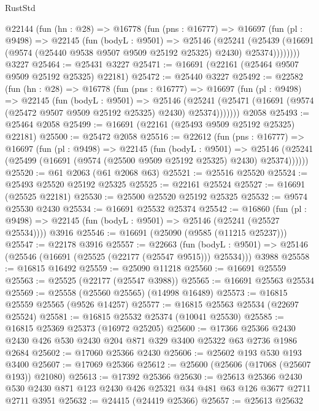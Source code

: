 \begin{lexlean}{RustStd}
\begin{coremodule}
    @22144
      (fun (hn : @28) =>
      @16778
        (fun (pns : @16777) =>
        @16697
          (fun (pl : @9498) =>
          @22145
            (fun (bodyL : @9501) =>
            @25146
              (@25241
                (@25439
                  (@16691 (@9574 (@25440 @9538 @9507 @9509 @25192 @25325) @2430) @25374))))))))
    @3227
@25464 := @25431 @3227
@25471 := @16691 (@22161 (@25464 @9507 @9509 @25192 @25325) @22181)
@25472 := @25440 @3227
@25492 := @22582
    (fun (hn : @28) =>
    @16778
      (fun (pns : @16777) =>
      @16697
        (fun (pl : @9498) =>
        @22145
          (fun (bodyL : @9501) =>
          @25146
            (@25241 (@25471 (@16691 (@9574 (@25472 @9507 @9509 @25192 @25325) @2430) @25374)))))))
    @2058
@25493 := @25464 @2058
@25499 := @16691 (@22161 (@25493 @9509 @25192 @25325) @22181)
@25500 := @25472 @2058
@25516 := @22612
    (fun (pns : @16777) =>
    @16697
      (fun (pl : @9498) =>
      @22145
        (fun (bodyL : @9501) =>
        @25146 (@25241 (@25499 (@16691 (@9574 (@25500 @9509 @25192 @25325) @2430) @25374))))))
@25520 := @61 @2063 (@61 @2068 @63)
@25521 := @25516 @25520
@25524 := @25493 @25520 @25192 @25325
@25525 := @22161 @25524
@25527 := @16691 (@25525 @22181)
@25530 := @25500 @25520 @25192 @25325
@25532 := @9574 @25530 @2430
@25534 := @16691 @25532 @25374
@25542 := @16860
    (fun (pl : @9498) => @22145 (fun (bodyL : @9501) => @25146 (@25241 (@25527 @25534))))
    @3916
@25546 := @16691 (@25090 (@9585 (@11215 @25237)))
@25547 := @22178 @3916
@25557 := @22663
    (fun (bodyL : @9501) => @25146 (@25546 (@16691 (@25525 (@22177 (@25547 @9515))) @25534)))
    @3988
@25558 := @16815 @16492
@25559 := @25090 @11218
@25560 := @16691 @25559
@25563 := @25525 (@22177 (@25547 @3988))
@25565 := @16691 @25563 @25534
@25569 := @25558 (@25560 @25565) (@14998 @16489)
@25573 := @16815 @25559 @25565 (@9526 @14257)
@25577 := @16815 @25563 @25534 (@22697 @25524)
@25581 := @16815 @25532 @25374 (@10041 @25530)
@25585 := @16815 @25369 @25373 (@16972 @25205)
@25600 := @17366
    @25366
    @2430
    @2430
    @426
    @530
    @2430
    @204
    @871
    @329
    @3400
    @25322
    @63
    @2736
    @1986
    @2684
@25602 := @17060 @25366 @2430
@25606 := @25602 @193 @530 @193 @3400
@25607 := @17069 @25366
@25612 := @25600 (@25606 (@17068 (@25607 @193)) @21080)
@25613 := @17392 @25366
@25630 := @25613
    @25366
    @2430
    @530
    @2430
    @871
    @123
    @2430
    @426
    @25321
    @34
    @481
    @63
    @126
    @3677
    @2711
    @2711
    @3951
@25632 := @24415 (@24419 @25366)
@25657 := @25613
    @25632

\end{coremodule}
\end{lexlean}
